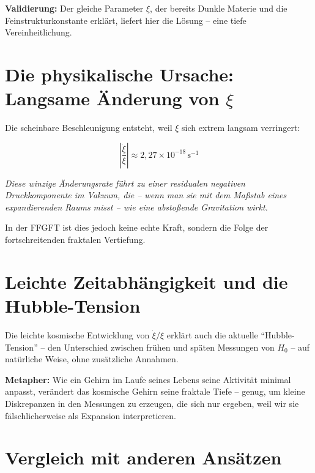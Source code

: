 	\textbf{Validierung:} Der gleiche Parameter \(\xi\), der bereits Dunkle Materie und die Feinstrukturkonstante erklärt, liefert hier die Lösung – eine tiefe Vereinheitlichung.
	
	\section{Die physikalische Ursache: Langsame Änderung von \(\xi\)}
	
	Die scheinbare Beschleunigung entsteht, weil \(\xi\) sich extrem langsam verringert:
	
	\begin{equation}
		\left|\frac{\dot{\xi}}{\xi}\right| \approx 2{,}27 \times 10^{-18} \, \text{s}^{-1}
	\end{equation}
	
	\textit{Diese winzige Änderungsrate führt zu einer residualen negativen Druckkomponente im Vakuum, die – wenn man sie mit dem Maßstab eines expandierenden Raums misst – wie eine abstoßende Gravitation wirkt.}
	
	In der FFGFT ist dies jedoch keine echte Kraft, sondern die Folge der fortschreitenden fraktalen Vertiefung.
	
	\section{Leichte Zeitabhängigkeit und die Hubble-Tension}
	
	Die leichte kosmische Entwicklung von \(\dot{\xi}/\xi\) erklärt auch die aktuelle \enquote{Hubble-Tension} – den Unterschied zwischen frühen und späten Messungen von \(H_0\) – auf natürliche Weise, ohne zusätzliche Annahmen.
	
	\textbf{Metapher:} Wie ein Gehirn im Laufe seines Lebens seine Aktivität minimal anpasst, verändert das kosmische Gehirn seine fraktale Tiefe – genug, um kleine Diskrepanzen in den Messungen zu erzeugen, die sich nur ergeben, weil wir sie fälschlicherweise als Expansion interpretieren.
	
	\section{Vergleich mit anderen Ansätzen}
	
